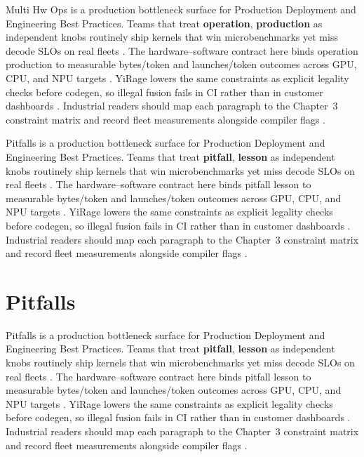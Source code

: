 Multi Hw Ops is a production bottleneck surface for Production Deployment and Engineering Best Practices. Teams that treat \textbf{operation}, \textbf{production} as independent knobs routinely ship kernels that win microbenchmarks yet miss decode SLOs on real fleets \citep{patel2025llminference,nvidia2022hopper}. The hardware--software contract here binds operation production to measurable bytes/token and launches/token outcomes across GPU, CPU, and NPU targets \citep{taxbreak2026,semianalysis2024tma}. YiRage lowers the same constraints as explicit legality checks before codegen, so illegal fusion fails in CI rather than in customer dashboards \citep{memoryfloor2026,amd2024xdna}. Industrial readers should map each paragraph to the Chapter~3 constraint matrix and record fleet measurements alongside compiler flags \citep{nvidia2022hopper,amd2024aie}.

Pitfalls is a production bottleneck surface for Production Deployment and Engineering Best Practices. Teams that treat \textbf{pitfall}, \textbf{lesson} as independent knobs routinely ship kernels that win microbenchmarks yet miss decode SLOs on real fleets \citep{taxbreak2026,semianalysis2024tma}. The hardware--software contract here binds pitfall lesson to measurable bytes/token and launches/token outcomes across GPU, CPU, and NPU targets \citep{memoryfloor2026,amd2024xdna}. YiRage lowers the same constraints as explicit legality checks before codegen, so illegal fusion fails in CI rather than in customer dashboards \citep{nvidia2022hopper,amd2024aie}. Industrial readers should map each paragraph to the Chapter~3 constraint matrix and record fleet measurements alongside compiler flags \citep{semianalysis2024tma,dlbook}.

\section{Pitfalls}
\label{sec:pitfalls}

Pitfalls is a production bottleneck surface for Production Deployment and Engineering Best Practices. Teams that treat \textbf{pitfall}, \textbf{lesson} as independent knobs routinely ship kernels that win microbenchmarks yet miss decode SLOs on real fleets \citep{memoryfloor2026,amd2024xdna}. The hardware--software contract here binds pitfall lesson to measurable bytes/token and launches/token outcomes across GPU, CPU, and NPU targets \citep{nvidia2022hopper,amd2024aie}. YiRage lowers the same constraints as explicit legality checks before codegen, so illegal fusion fails in CI rather than in customer dashboards \citep{semianalysis2024tma,dlbook}. Industrial readers should map each paragraph to the Chapter~3 constraint matrix and record fleet measurements alongside compiler flags \citep{amd2024xdna,dao2022flashattention}.

